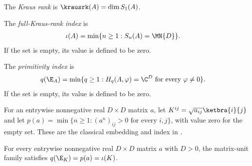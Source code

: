 \begin{definition}\label{def:wielandt_kraus_rank}
    \leanok
    The \emph{Kraus rank} is
    $\krausrk(A)=\dim S_1(A)$.
\end{definition}

\begin{definition}\label{def:wielandt_i_index}
    \leanok
    The \emph{full-Kraus-rank index} is
    \begin{align}
        \iota(A)
         & =\min\{n\ge1:S_n(A)=\MN{D}\}.
        \notag
    \end{align}
    If the set is empty, its value is defined to be zero.
\end{definition}

\begin{definition}\label{def:wielandt_q_index}
    \leanok
    The \emph{primitivity index} is
    \begin{align}
        q(\E_A)
         & =\min\{q\ge1:H_q(A,\varphi)=\C^D
        \text{ for every }\varphi\neq0\}.
        \notag
    \end{align}
    If the set is empty, its value is defined to be zero.
\end{definition}

\begin{definition}
    \label{def:stochastic_wielandt_embedding}
    \leanok
    For an entrywise nonnegative real $D\times D$ matrix $a$, let
    $K^{ij}=\sqrt{a_{ij}}\ketbra{i}{j}$ and let
    $p(a)=\min\{n\ge1:(a^n)_{ij}>0\text{ for every }i,j\}$,
    with value zero for the empty set. These are the classical embedding
    and index in \cite[Proposition~2]{Sanz2010Quantum}.
\end{definition}

\begin{lemma}
    \label{thm:stochastic_wielandt_indices}
    \leanok
    For every entrywise nonnegative real $D\times D$ matrix $a$ with
    $D>0$, the matrix-unit family satisfies $q(\E_K)=p(a)=\iota(K)$.
\end{lemma}

